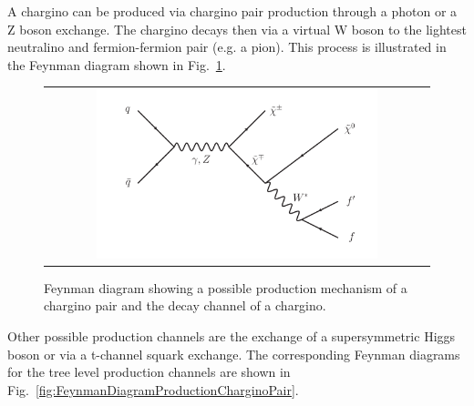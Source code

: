A chargino can be produced via chargino pair production through a photon or a Z boson exchange. The chargino decays then via a virtual W boson to the lightest neutralino and fermion-fermion pair (e.g. a pion).
This process is illustrated in the Feynman diagram shown in Fig.~\ref{fig:FeynmanDiagram}.

\begin{figure}[!b]
  \centering 
  \begin{tabular}{c}
    \includegraphics[width=0.75\textwidth]{figures/analysis/ChiChi_ProductionAndDecay.pdf}
  \end{tabular}
  \caption{Feynman diagram showing a possible production mechanism of a chargino pair and the decay channel of a chargino.}
  \label{fig:FeynmanDiagram}
\end{figure}

Other possible production channels are the exchange of a supersymmetric Higgs boson or via a t-channel squark exchange. 
The corresponding Feynman diagrams for the tree level production channels are shown in Fig.~\ref{fig:FeynmanDiagramProductionCharginoPair}.

